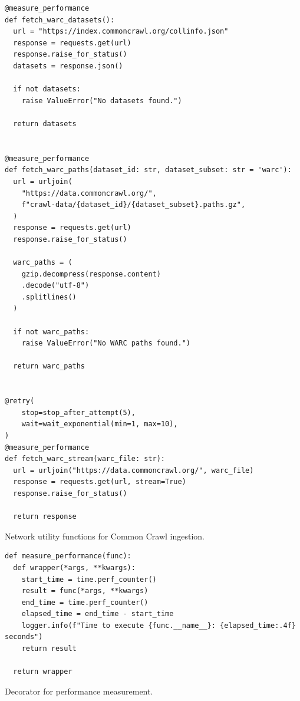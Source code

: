 \begin{listing}[H]
\begin{verbatim}
@measure_performance
def fetch_warc_datasets():
  url = "https://index.commoncrawl.org/collinfo.json"
  response = requests.get(url)
  response.raise_for_status()
  datasets = response.json()

  if not datasets:
    raise ValueError("No datasets found.")

  return datasets


@measure_performance
def fetch_warc_paths(dataset_id: str, dataset_subset: str = 'warc'):
  url = urljoin(
    "https://data.commoncrawl.org/",
    f"crawl-data/{dataset_id}/{dataset_subset}.paths.gz",
  )
  response = requests.get(url)
  response.raise_for_status()

  warc_paths = (
    gzip.decompress(response.content)
    .decode("utf-8")
    .splitlines()
  )

  if not warc_paths:
    raise ValueError("No WARC paths found.")

  return warc_paths


@retry(
    stop=stop_after_attempt(5),
    wait=wait_exponential(min=1, max=10),
)
@measure_performance
def fetch_warc_stream(warc_file: str):
  url = urljoin("https://data.commoncrawl.org/", warc_file)
  response = requests.get(url, stream=True)
  response.raise_for_status()

  return response
\end{verbatim}
\caption{Network utility functions for Common Crawl ingestion.}
\label{lst:dagster-source-common-crawl-fetch}
\end{listing}


\begin{listing}[H]
\begin{verbatim}
def measure_performance(func):
  def wrapper(*args, **kwargs):
    start_time = time.perf_counter()
    result = func(*args, **kwargs)
    end_time = time.perf_counter()
    elapsed_time = end_time - start_time
    logger.info(f"Time to execute {func.__name__}: {elapsed_time:.4f} seconds")
    return result

  return wrapper
\end{verbatim}
\caption{Decorator for performance measurement.}
\label{lst:dagster-utility-performance-measurement}
\end{listing}


